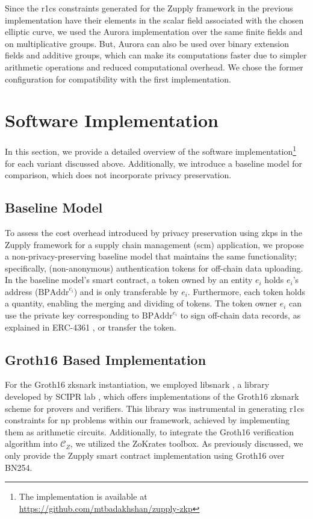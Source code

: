 Since the \gls{r1cs} constraints generated for the Zupply framework in the previous implementation have their elements in the scalar field associated with the chosen elliptic curve, we used the Aurora implementation over the same finite fields and on multiplicative groups. But, Aurora can also be used over binary extension fields and additive groups, which can make its computations faster due to simpler arithmetic operations and reduced computational overhead. We chose the former configuration for compatibility with the first implementation.




\section{Software Implementation}

In this section, we provide a detailed overview of the \CC software implementation\footnote{The implementation is available at \url{https://github.com/mtbadakhshan/zupply-zkp}} for each variant discussed above. Additionally, we introduce a baseline model for comparison, which does not incorporate privacy preservation. 

\subsection{Baseline Model}
To assess the cost overhead introduced by privacy preservation using \gls{zkp}s in the Zupply framework for a supply chain management (\gls{scm}) application, we propose a non-privacy-preserving baseline model that maintains the same functionality; specifically, (non-anonymous) authentication tokens for off-chain data uploading. In the baseline model's smart contract, a token owned by an entity $e_i$ holds $e_i$'s address ($\text{BPAddr}^{e_i}$) and is only transferable by $e_i$. Furthermore, each token holds a quantity, enabling the merging and dividing of tokens. The token owner $e_i$ can use the private key corresponding to $\text{BPAddr}^{e_i}$ to sign off-chain data records, as explained in ERC-4361 \cite{ERC-4361}, or transfer the token.

\subsection{Groth16 Based Implementation}
For the Groth16 \gls{zksnark} instantiation, we employed libsnark \cite{libsnark}, a \CC library developed by SCIPR lab \cite{SCIPR}, which offers implementations of the Groth16 \gls{zksnark} scheme for provers and verifiers. This library was instrumental in generating \gls{r1cs} constraints for \gls{np} problems within our framework, achieved by implementing them as arithmetic circuits. Additionally, to integrate the Groth16 verification algorithm into $\mathcal{C}_Z$, we utilized the ZoKrates \cite{ZoKrates} toolbox. As previously discussed, we only provide the Zupply smart contract implementation using Groth16 over BN254. 

